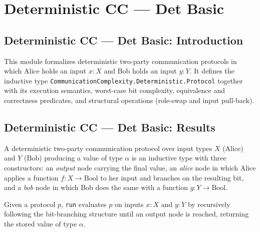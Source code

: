 \section{Deterministic CC --- Det Basic}
\subsection*{Deterministic CC --- Det Basic: Introduction}

This module formalizes deterministic two-party communication protocols in which Alice holds
an input $x : X$ and Bob holds an input $y : Y$.  It defines the inductive type
\texttt{CommunicationComplexity.Deterministic.Protocol} together with its execution semantics,
worst-case bit complexity, equivalence and correctness predicates, and structural operations
(role-swap and input pull-back).

\subsection*{Deterministic CC --- Det Basic: Results}

\begin{definition}
\label{CommunicationComplexity.Deterministic.Protocol}
\leanok
A deterministic two-party communication protocol over input types $X$ (Alice) and $Y$ (Bob)
producing a value of type $\alpha$ is an inductive type with three constructors: an
\emph{output} node carrying the final value, an \emph{alice} node in which Alice applies a
function $f : X \to \mathrm{Bool}$ to her input and branches on the resulting bit, and a
\emph{bob} node in which Bob does the same with a function $g : Y \to \mathrm{Bool}$.
\end{definition}

\begin{definition}
\label{CommunicationComplexity.Deterministic.Protocol.run}
\leanok
{}
Given a protocol $p$, \texttt{run} evaluates $p$ on inputs $x : X$ and $y : Y$ by
recursively following the bit-branching structure until an output node is reached,
returning the stored value of type $\alpha$.
\end{definition}

